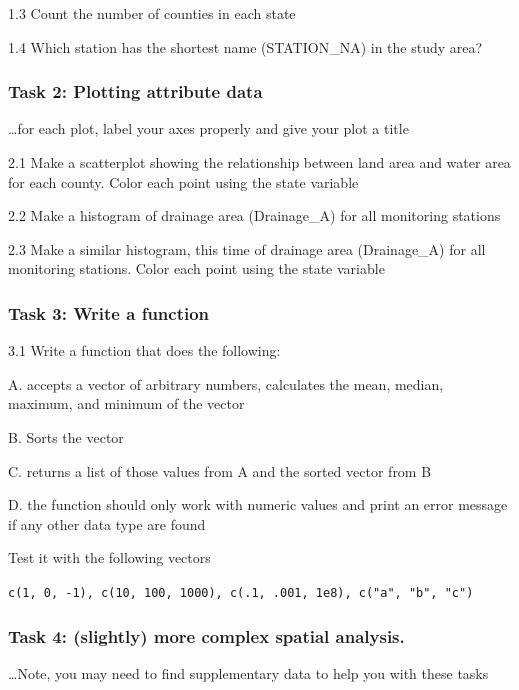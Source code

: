 \documentclass[]{article}
\begin{document}
1.3 Count the number of counties in each state

1.4 Which station has the shortest name (STATION\_NA) in the study area?

\hypertarget{task-2-plotting-attribute-data}{%
\subsubsection{Task 2: Plotting attribute
data}\label{task-2-plotting-attribute-data}}

\ldots for each plot, label your axes properly and give your plot a
title

2.1 Make a scatterplot showing the relationship between land area and
water area for each county. Color each point using the state variable

2.2 Make a histogram of drainage area (Drainage\_A) for all monitoring
stations

2.3 Make a similar histogram, this time of drainage area (Drainage\_A)
for all monitoring stations. Color each point using the state variable

\hypertarget{task-3-write-a-function}{%
\subsubsection{Task 3: Write a function}\label{task-3-write-a-function}}

3.1 Write a function that does the following:

A. accepts a vector of arbitrary numbers, calculates the mean, median,
maximum, and minimum of the vector

B. Sorts the vector

C. returns a list of those values from A and the sorted vector from B

D. the function should only work with numeric values and print an error
message if any other data type are found

Test it with the following vectors

\texttt{c(1,\ 0,\ -1),\ c(10,\ 100,\ 1000),\ c(.1,\ .001,\ 1e8),\ c("a",\ "b",\ "c")}

\hypertarget{task-4-slightly-more-complex-spatial-analysis.}{%
\subsubsection{Task 4: (slightly) more complex spatial
analysis.}\label{task-4-slightly-more-complex-spatial-analysis.}}

\ldots Note, you may need to find supplementary data to help you with
these tasks
\end{document}

